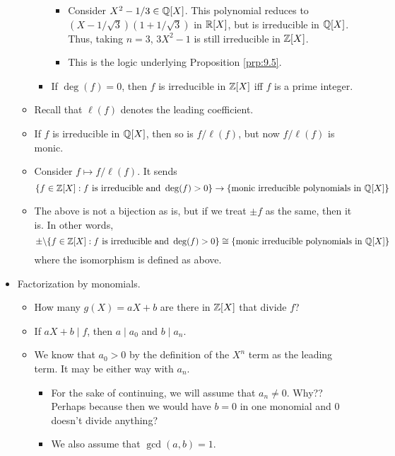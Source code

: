 \documentclass[../notes.tex]{subfiles}
\begin{document}
\begin{itemize}
\begin{itemize}
\begin{itemize}
\begin{itemize}
                \item Consider $X^2-1/3\in\mathbb{Q}[X]$. This polynomial reduces to $(X-1/\sqrt{3})(1+1/\sqrt{3})$ in $\mathbb{R}[X]$, but is irreducible in $\mathbb{Q}[X]$. Thus, taking $n=3$, $3X^2-1$ is still irreducible in $\mathbb{Z}[X]$.
                \item This is the logic underlying Proposition \ref{prp:9.5}.
            \end{itemize}
            \item If $\deg(f)=0$, then $f$ is irreducible in $\mathbb{Z}[X]$ iff $f$ is a prime integer.
        \end{itemize}
        \item Recall that $\ell(f)$ denotes the leading coefficient.
        \item If $f$ is irreducible in $\mathbb{Q}[X]$, then so is $f/\ell(f)$, but now $f/\ell(f)$ is monic.
        \item Consider $f\mapsto f/\ell(f)$. It sends
        \begin{equation*}
            \{f\in\mathbb{Z}[X]:f\text{ is irreducible and }\deg(f)>0\} \to \{\text{monic irreducible polynomials in }\mathbb{Q}[X]\}
        \end{equation*}
        \item The above is not a bijection as is, but if we treat $\pm f$ as the same, then it is. In other words,
        \begin{equation*}
            \pm\backslash\{f\in\mathbb{Z}[X]:f\text{ is irreducible and }\deg(f)>0\} \cong \{\text{monic irreducible polynomials in }\mathbb{Q}[X]\}
        \end{equation*}
        where the isomorphism is defined as above.
    \end{itemize}
    \item Factorization by monomials.
    \begin{itemize}
        \item How many $g(X)=aX+b$ are there in $\mathbb{Z}[X]$ that divide $f$?
        \item If $aX+b\mid f$, then $a\mid a_0$ and $b\mid a_n$.
        \item We know that $a_0>0$ by the definition of the $X^n$ term as the leading term. It may be either way with $a_n$.
        \begin{itemize}
            \item For the sake of continuing, we will assume that $a_n\neq 0$. Why?? Perhaps because then we would have $b=0$ in one monomial and 0 doesn't divide anything?
            \item We also assume that $\gcd(a,b)=1$.

\end{itemize}
\end{itemize}
\end{itemize}
\end{document}
